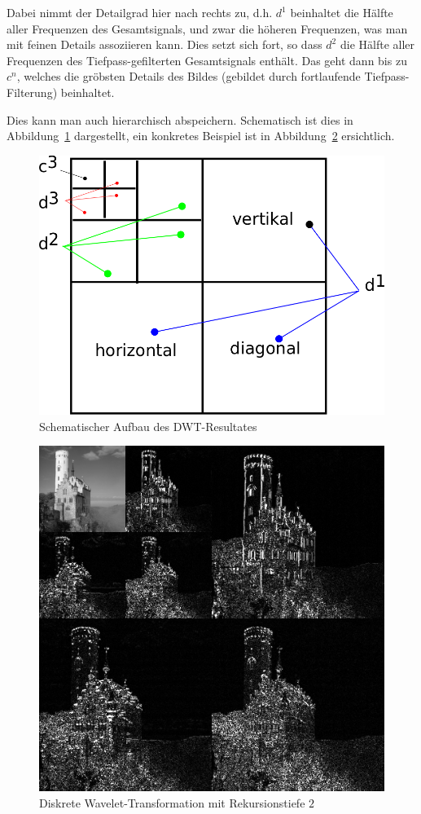 \begin{description}
    Dabei nimmt der Detailgrad hier nach rechts zu, d.h. $d^1$ beinhaltet die Hälfte aller Frequenzen des Gesamtsignals,
    und zwar die höheren Frequenzen, was man mit feinen Details assoziieren kann. Dies setzt sich fort, so dass $d^2$
    die Hälfte aller Frequenzen des Tiefpass-gefilterten Gesamtsignals enthält. Das geht dann 
    bis zu $c^n$, welches die gröbsten Details des Bildes (gebildet durch fortlaufende Tiefpass-Filterung) beinhaltet.


    Dies kann man auch hierarchisch abspeichern. Schematisch ist dies in Abbildung~\ref{fig:dwtscheme} 
    dargestellt, ein konkretes Beispiel ist in Abbildung~\ref{fig:dwtlichtenstein} ersichtlich.

    \begin{figure}[!ht]
      \centering
      \includegraphics[width=.6\textwidth]{Fotos/DWT.png}
      \caption{Schematischer Aufbau des DWT-Resultates}
      \label{fig:dwtscheme}
    \end{figure}

    \begin{figure}[!ht]
      \centering
      \includegraphics[width=.6\textwidth]{Fotos/DWT_Lichtenstein.png}
      \caption{Diskrete Wavelet-Transformation mit Rekursionstiefe $2$}
      \label{fig:dwtlichtenstein}
    \end{figure}


\end{description}
